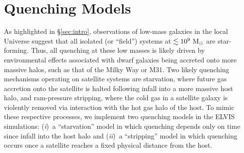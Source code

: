 
\section{Quenching Models}
\label{sec:models}


As highlighted in \S\ref{sec:intro}, observations of low-mass galaxies
in the local Universe suggest that all isolated (or ``field'') systems
at $\lesssim 10^{9}~{\rm M}_{\odot}$ are star-forming. Thus, all quenching at
these low masses is likely driven by environmental effects associated
with dwarf galaxies being accreted onto more massive halos, such as
that of the Milky Way or M31. Two likely quenching mechanisms
operating on satellite systems are starvation, where future gas
accretion onto the satellite is halted following infall into a more
massive host halo, and ram-pressure stripping, where the cold gas in a
satellite galaxy is violently removed via interaction with the hot gas
halo of the host. To mimic these respective processes, we implement
two quenching models in the ELVIS simulations: (\emph{i})~a
``starvation'' model in which quenching depends only on time since
infall into the host halo and (\emph{ii})~a ``stripping'' model in
which quenching occurs once a satellite reaches a fixed physical
distance from the host.


